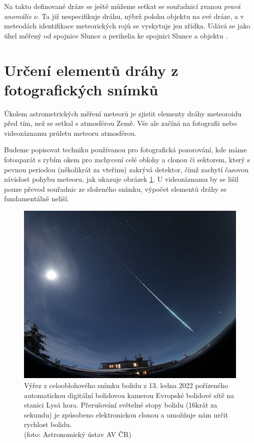 \medskip

Na takto definované dráze se ještě můžeme setkat se souřadnicí zvanou \textit{pravá anomálie} $\nu$. Ta již nespecifikuje dráhu, nýbrž polohu objektu na své dráze, a v meteodách identifikace meteorických rojů se vyskytuje jen zřídka. Udává se jako úhel měřený od spojnice Slunce a perihelia ke spojnici Slunce a objektu \cite{astro}.

\section{Určení elementů dráhy z fotografických snímků}\label{sec:photography}%
Úkolem astrometrických měření meteorů je zjistit elementy dráhy meteoroidu před tím, než se setkal s atmosférou Země. Vše ale začíná na fotografii nebo videozáznamu průletu meteoru atmosférou.

Budeme popisovat techniku používanou pro fotografická pozorování, kde máme fotoaparát s rybím okem pro zachycení celé oblohy a clonou či sektorem, který s pevnou periodou (několikrát za vteřinu) zakrývá detektor, čímž zachytí časovou závislost pohybu meteoru, jak ukazuje obrázek \ref{img:observation:wholesky}. U videozáznamu by se lišil pouze převod souřadnic ze složeného snímku, výpočet elementů dráhy se fundamentálně neliší.

\pagebreak
\begin{figure}[h]
    \centering
    \includegraphics[width=.8\linewidth]{img/meteors/night-whole-sky.jpg}
    \caption[Výřez z celooblohového snímku bolidu]{
        Výřez z celooblohového snímku bolidu z 13. ledna 2022 pořízeného automatickou digitální bolidovou kamerou Evropské bolidové sítě na stanici Lysá hora. Přerušování světelné stopy bolidu (16krát za sekundu) je způsobeno elektronickou clonou a umožňuje nám určit rychlost bolidu.\footnotemark\\
        {\small (foto: Astronomický ústav AV ČR)}
    }
    \label{img:observation:wholesky}
\end{figure}

